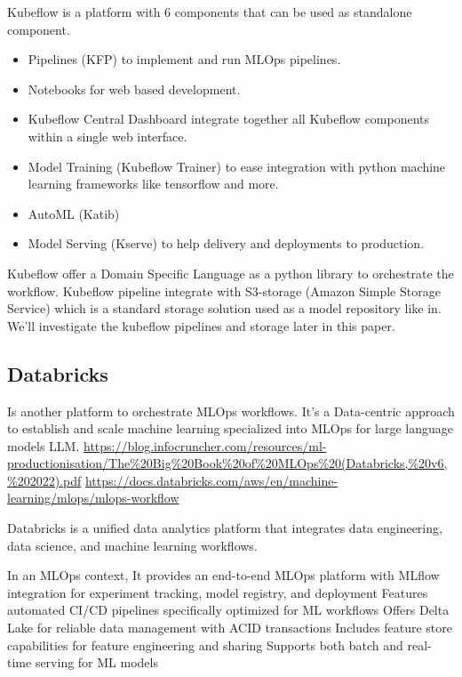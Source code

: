 Kubeflow is a platform with 6 components that can be used as standalone component\cite{Kubeflow}.
\begin{itemize}
    \item Pipelines (KFP) to implement and run MLOps pipelines.
    \item Notebooks for web based development.
    \item Kubeflow Central Dashboard integrate together all Kubeflow components within a single web interface.
    \item Model Training (Kubeflow Trainer) to ease integration with python machine learning frameworks like tensorflow and more.
    \item AutoML (Katib)
    \item Model Serving (Kserve) to help delivery and deployments to production.
\end{itemize}

Kubeflow offer a Domain Specific Language as a python library to orchestrate the workflow.
Kubeflow pipeline integrate with S3-storage (Amazon Simple Storage Service) which is a standard storage solution used as a model repository like in\cite{BURGUENOROMERO2025107499}.
We'll investigate the kubeflow pipelines and storage later in this paper.

\subsection{Databricks}

Is another platform to orchestrate MLOps workflows.
It's a Data-centric approach to establish and scale machine learning specialized into MLOps for large language models LLM.
\url{https://blog.infocruncher.com/resources/ml-productionisation/The%20Big%20Book%20of%20MLOps%20(Databricks,%20v6,%202022).pdf}
\url{https://docs.databricks.com/aws/en/machine-learning/mlops/mlops-workflow}

Databricks is a unified data analytics platform that integrates data engineering, data science, and machine learning workflows.

In an MLOps context, It provides an end-to-end MLOps platform with MLflow integration for experiment tracking, model registry, and deployment
Features automated CI/CD pipelines specifically optimized for ML workflows
Offers Delta Lake for reliable data management with ACID transactions
Includes feature store capabilities for feature engineering and sharing
Supports both batch and real-time serving for ML models

